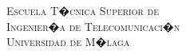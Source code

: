 \begin{titlepage}

    \begin{center}
		\Large {\textsc{\textsf{
		Escuela T�cnica Superior de\\
		Ingenier�a de Telecomunicaci�n\\
		Universidad de M�laga}	}}
	\end{center}

\end{titlepage}